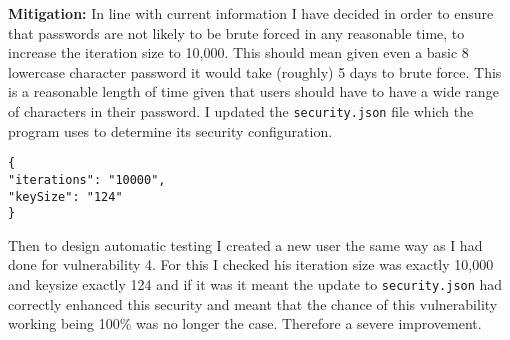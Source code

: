 \textbf{Mitigation:} In line with current information I have decided in order to ensure that passwords are not likely to be brute forced in any reasonable time, to increase the
iteration size to 10,000\cite{10.1007/978-3-030-11437-4_8}. This should mean given even a basic 8 lowercase character password it would take (roughly) 5 days to brute force. This is a reasonable length of time
given that users should have to have a wide range of characters in their password. I updated the \verb|security.json| file which the program uses to determine its security
configuration.
\begin{verbatim}
{
"iterations": "10000",
"keySize": "124"
}
\end{verbatim}
Then to design automatic testing I created a new user the same way as I had done for vulnerability 4. For this I checked his iteration size was exactly 10,000 and keysize exactly 124 and if it was
it meant the update to \verb|security.json| had correctly enhanced this security and meant that the chance of this vulnerability working being 100\% was no longer the case. Therefore
a severe improvement.

